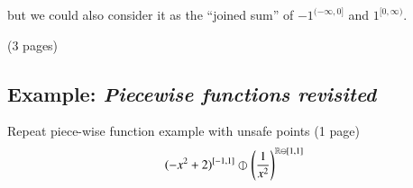 but we could also consider it as the ``joined sum'' of $-1^{(-\infty, 0]}$ and $1^{[0, \infty)}$.

(3 pages)

\newpage

\subsection{Example: \emph{Piecewise functions revisited}}
Repeat piece-wise function example with unsafe points (1 page)
\begin{equation}
(-x^2+2)^{[-1,1]} \varobar^{} \left( \frac{1}{x^2} \right)^{\mathbb{R} \ominus [1,1]}
\end{equation}


\newpage